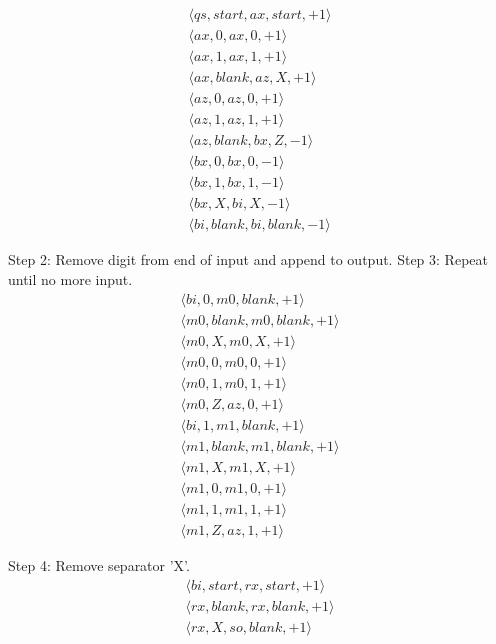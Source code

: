 \documentclass[12pt]{extarticle}
\begin{document}
\begin{align*}
\langle qs, start, ax, start, +1 \rangle \\
\langle ax, 0, ax, 0, +1 \rangle \\
\langle ax, 1, ax, 1, +1 \rangle \\
\langle ax, blank, az, X, +1 \rangle \\
\langle az, 0, az, 0, +1 \rangle \\
\langle az, 1, az, 1, +1 \rangle \\
\langle az, blank, bx, Z, -1 \rangle \\
\langle bx, 0, bx, 0, -1 \rangle \\
\langle bx, 1, bx, 1, -1 \rangle \\
\langle bx, X, bi, X, -1 \rangle \\
\langle bi, blank, bi, blank, -1 \rangle
\end{align*}

Step 2: Remove digit from end of input and append to output.
Step 3: Repeat until no more input.
\begin{align*}
\langle bi, 0, m0, blank, +1 \rangle \\
\langle m0, blank, m0, blank, +1 \rangle \\
\langle m0, X, m0, X, +1 \rangle \\
\langle m0, 0, m0, 0, +1 \rangle \\
\langle m0, 1, m0, 1, +1 \rangle \\
\langle m0, Z, az, 0, +1 \rangle \\
\langle bi, 1, m1, blank, +1 \rangle \\
\langle m1, blank, m1, blank, +1 \rangle \\
\langle m1, X, m1, X, +1 \rangle \\
\langle m1, 0, m1, 0, +1 \rangle \\
\langle m1, 1, m1, 1, +1 \rangle \\
\langle m1, Z, az, 1, +1 \rangle
\end{align*}

Step 4: Remove separator 'X'.
\begin{align*}
\langle bi, start, rx, start, +1 \rangle \\
\langle rx, blank, rx, blank, +1 \rangle \\
\langle rx, X, so, blank, +1 \rangle
\end{align*}
\end{document}
